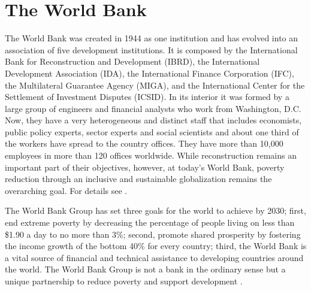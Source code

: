 \section{The World Bank}\label{sec_intro_wb}

The World Bank was created in 1944 as one institution and has evolved into an association of five development institutions. It is composed by  the International Bank for Reconstruction and Development (IBRD), the International Development Association (IDA), the International Finance Corporation (IFC), the Multilateral Guarantee Agency (MIGA), and the International Center for the Settlement of Investment Disputes (ICSID). In its interior it was formed by a large group of engineers and financial analysts who work from Washington, D.C. Now, they have a very heterogeneous and distinct staff that includes economists, public policy experts, sector experts and social scientists and about one third of the workers have spread to the country offices. They have more than 10,000 employees in more than 120 offices worldwide. While reconstruction remains an important part of their objectives, however, at today's World Bank, poverty reduction through an inclusive and sustainable globalization remains the overarching goal. For details see \parencite{wb_history}. 

The World Bank Group has set three goals for the world to achieve by 2030; first, end extreme poverty by decreasing the percentage of people living on less than \$1.90 a day to no more than 3\%; second, promote shared prosperity by fostering the income growth of the bottom 40\% for every country; third, the World Bank is a vital source of financial and technical assistance to developing countries around the world. The World Bank Group is not a bank in the ordinary sense but a unique partnership to reduce poverty and support development \parencite{wb_about}.

